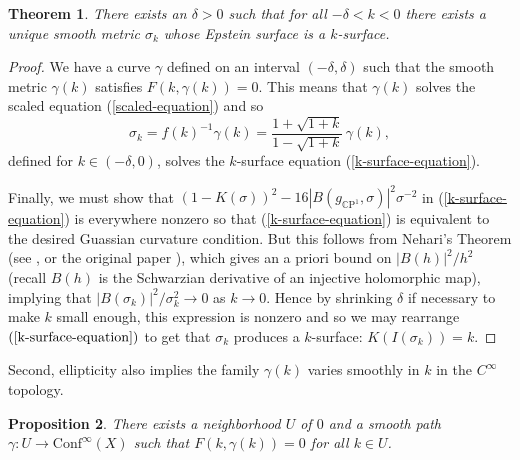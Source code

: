 \documentclass{amsart}
\newcommand{\CP}{\mathbb{C}\mathrm{P}}
\newtheorem{thm}{Theorem}[section]
\newtheorem{prop}[thm]{Proposition}
\begin{document}
\begin{thm}
\label{k-surfaces-existence}
There exists an $\delta > 0$ such that for all $-\delta < k < 0$ there exists a unique smooth metric $\sigma_k$ whose Epstein surface is a $k$-surface.
\end{thm}

\begin{proof}
We have a curve $\gamma$ defined on an interval $(-\delta, \delta)$ such that the smooth metric $\gamma(k)$ satisfies $F(k,\gamma(k)) = 0$. 
This means that $\gamma(k)$ solves the scaled equation (\ref{scaled-equation}) and so 
\[
\sigma_k = f(k)^{-1} \gamma(k) =  \frac{1 + \sqrt{1+k}}{1 - \sqrt{1+k}} \, \gamma(k),
\]
defined for $k \in (-\delta,0)$, solves the $k$-surface equation (\ref{k-surface-equation}). 

Finally, we must show that $(1-K(\sigma))^2 - 16|B(g_{\CP^1},\sigma)|^2\sigma^{-2}$ in (\ref{k-surface-equation}) is everywhere nonzero so that (\ref{k-surface-equation}) is equivalent to the desired Guassian curvature condition.
But this follows from Nehari's Theorem (see \cite[Theorem 1.3]{lehto-1987}, or the original paper \cite{nehari-1949}), which gives an a priori bound on $|B(h)|^2/h^2$ (recall $B(h)$ is the Schwarzian derivative of an injective holomorphic map), implying that $|B(\sigma_k)|^2/\sigma_k^2 \to 0$ as $k \to 0$. 
Hence by shrinking $\delta$ if necessary to make $k$ small enough, this expression is nonzero and so we may rearrange $(\ref{k-surface-equation})$ to get that $\sigma_k$ produces a $k$-surface: $K(I(\sigma_k)) = k$.
\end{proof}

Second, ellipticity also implies the family $\gamma(k)$ varies smoothly in $k$ in the $C^\infty$ topology. 

\begin{prop}
There exists a neighborhood $U$ of $0$ and a smooth path $\gamma: U \to \mathrm{Conf}^\infty(X)$ such that $F(k,\gamma(k)) = 0$ for all $k \in U$. 
\end{prop}
\end{document}
